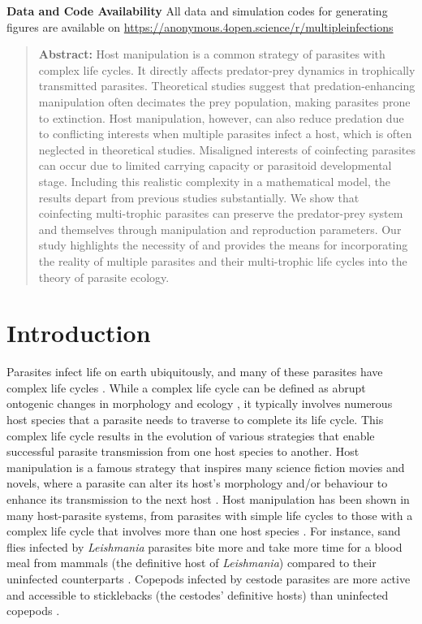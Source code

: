 \documentclass[a4paper]{scrartcl}
\begin{document}
\textbf{Data and Code Availability}
All data and simulation codes for generating figures are available on 
\url{https://anonymous.4open.science/r/multipleinfections}

\newpage
\sffamily

\begin{abstract}{
\textbf{Abstract:} 
Host manipulation is a common strategy of parasites with complex life cycles. 
It directly affects predator-prey dynamics in trophically transmitted parasites. 
Theoretical studies suggest that predation-enhancing manipulation often decimates the prey population, making parasites prone to extinction. 
Host manipulation, however, can also reduce predation due to conflicting interests when multiple parasites infect a host, which is often neglected in theoretical studies.
Misaligned interests of coinfecting parasites can occur due to limited carrying capacity or parasitoid developmental stage.
Including this realistic complexity in a mathematical model, the results depart from previous studies substantially. 
We show that coinfecting multi-trophic parasites can preserve the predator-prey system and themselves through manipulation and reproduction parameters.
Our study highlights the necessity of and provides the means for incorporating the reality of multiple parasites and their multi-trophic life cycles into the theory of parasite ecology.
}
\end{abstract}

\sffamily
\newpage

\section*{Introduction}


Parasites infect life on earth ubiquitously, and many of these parasites have complex life cycles \citep{zimmer:book:2001}. 
While a complex life cycle can be defined as abrupt ontogenic changes in morphology and ecology \citep{Benesh:2016dj}, it typically involves numerous host species that a parasite needs to traverse to complete its life cycle. 
This complex life cycle results in the evolution of various strategies that enable successful parasite transmission from one host species to another. 
Host manipulation is a famous strategy that inspires many science fiction movies and novels, where a parasite can alter its host's morphology and/or behaviour to enhance its transmission to the next host \citep{Hughes2012}. 
Host manipulation has been shown in many host-parasite systems, from parasites with simple life cycles to those with a complex life cycle that involves more than one host species \citep{Hughes2012,molyneux_jefferies1986}. 
For instance, sand flies infected by \textit{Leishmania} parasites bite more and take more time for a blood meal from mammals (the definitive host of \textit{Leishmania}) compared to their uninfected counterparts \citep{Rogers2007}. 
Copepods infected by cestode parasites are more active and accessible to sticklebacks (the cestodes' definitive hosts) than uninfected copepods \citep{Wedekind1996}.
\end{document}
